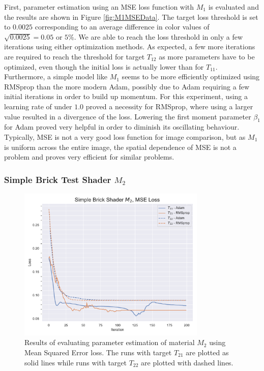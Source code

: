 First, parameter estimation using an MSE loss function with $M_1$ is evaluated and the results are shown in Figure \ref{fig:M1MSEData}. The target loss threshold is set to $0.0025$ corresponding to an average difference in color values of $\sqrt{0.0025}=0.05$ or $5\%$. We are able to reach the loss threshold in only a few iterations using either optimization methods. As expected, a few more iterations are required to reach the threshold for target $T_{12}$ as more parameters have to be optimized, even though the initial loss is actually lower than for $T_{11}$. Furthermore, a simple model like $M_1$ seems to be more efficiently optimized using RMSprop than the more modern Adam, possibly due to Adam requiring a few initial iterations in order to build up momentum. For this experiment, using a learning rate of under $1.0$ proved a necessity for RMSprop, where using a larger value resulted in a divergence of the loss. Lowering the first moment parameter $\beta_1$ for Adam proved very helpful in order to diminish its oscillating behaviour. Typically, MSE is not a very good loss function for image comparison, but as $M_1$ is uniform across the entire image, the spatial dependence of MSE is not a problem and proves very efficient for similar problems.

\subsubsection{Simple Brick Test Shader $M_2$}
\begin{figure}[hp]
    \centering
    \includegraphics[width=0.8\textwidth]{img/evaluation/M2/SBS_MSE.pdf}
    \caption{Results of evaluating parameter estimation of material $M_2$ using Mean Squared Error loss. The runs with target $T_{21}$ are plotted as solid lines while runs with target $T_{22}$ are plotted with dashed lines.}
    \label{fig:M2MSEData}
\end{figure}

